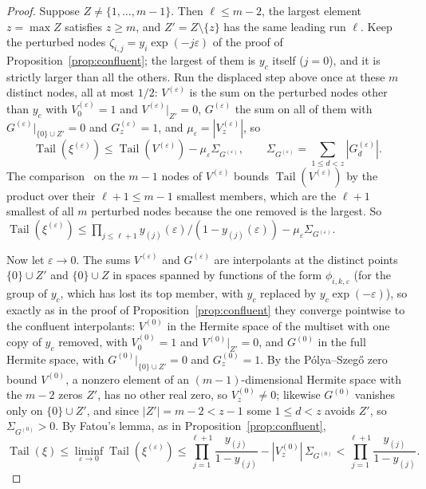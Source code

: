 \documentclass[11pt]{article}
\theoremstyle{definition}
\theoremstyle{plain}
\DeclareMathOperator{\Tail}{Tail}
\begin{document}
\begin{proof}
Suppose $Z\ne\{1,\ldots,m-1\}$.  Then $\ell\le m-2$, the largest element
$z=\max Z$ satisfies $z\ge m$, and $Z'=Z\setminus\{z\}$ has the same leading
run $\ell$.  Keep the perturbed nodes $\zeta_{i,j}=y_i\exp(-j\varepsilon)$ of the
proof of Proposition~\ref{prop:confluent}; the largest of them is
$y_c$ itself ($j=0$), and it is strictly larger than all the others.  Run the
displaced step above once at these $m$ distinct nodes, all at most $1/2$:
$V^{(\varepsilon)}$ is the sum on the perturbed nodes other than $y_c$ with
$V^{(\varepsilon)}_0=1$ and $V^{(\varepsilon)}|_{Z'}=0$, $G^{(\varepsilon)}$
the sum on all of them with $G^{(\varepsilon)}|_{\{0\}\cup Z'}=0$ and
$G^{(\varepsilon)}_z=1$, and $\mu_\varepsilon=|V^{(\varepsilon)}_z|$, so
\[
  \Tail(\xi^{(\varepsilon)})
  \le\Tail(V^{(\varepsilon)})-\mu_\varepsilon \Sigma_{G^{(\varepsilon)}},
  \qquad
  \Sigma_{G^{(\varepsilon)}}=\sum_{1\le d<z}|G^{(\varepsilon)}_d| .
\]
The comparison~\cite[Theorem~2.2]{coefficient-mass} on the $m-1$ nodes of $V^{(\varepsilon)}$ bounds
$\Tail(V^{(\varepsilon)})$ by the product over their $\ell+1\le m-1$ smallest
members, which are the $\ell+1$ smallest of all $m$ perturbed nodes because the
one removed is the largest.  So
$\Tail(\xi^{(\varepsilon)})\le\prod_{j\le \ell+1}y_{(j)}(\varepsilon)/(1-y_{(j)}(\varepsilon))
-\mu_\varepsilon \Sigma_{G^{(\varepsilon)}}$.

Now let $\varepsilon\to0$.  The sums $V^{(\varepsilon)}$ and
$G^{(\varepsilon)}$ are interpolants at the distinct points $\{0\}\cup Z'$
and $\{0\}\cup Z$ in spaces spanned by functions of the form
$\phi_{i,k,\varepsilon}$ (for the group of $y_c$, which has lost its top
member, with $y_c$ replaced by $y_c\exp(-\varepsilon)$), so exactly as in the
proof of Proposition~\ref{prop:confluent} they converge pointwise to the
confluent interpolants: $V^{(0)}$ in the Hermite space of the multiset with one
copy of $y_c$ removed, with $V^{(0)}_0=1$ and $V^{(0)}|_{Z'}=0$, and $G^{(0)}$
in the full Hermite space, with $G^{(0)}|_{\{0\}\cup Z'}=0$ and $G^{(0)}_z=1$.
By the P\'olya--Szeg\H o zero bound $V^{(0)}$, a nonzero element of an
$(m-1)$-dimensional Hermite space with the $m-2$ zeros $Z'$, has no other real
zero, so $V^{(0)}_z\ne0$; likewise $G^{(0)}$ vanishes only on
$\{0\}\cup Z'$, and since $|Z'|=m-2<z-1$ some $1\le d<z$ avoids $Z'$, so
$\Sigma_{G^{(0)}}>0$.  By Fatou's lemma, as in Proposition~\ref{prop:confluent},
\[
  \Tail(\xi)\le\liminf_{\varepsilon\to0}\Tail(\xi^{(\varepsilon)})
  \le\prod_{j=1}^{\ell+1}\frac{y_{(j)}}{1-y_{(j)}}-|V^{(0)}_z|\,\Sigma_{G^{(0)}}
  <\prod_{j=1}^{\ell+1}\frac{y_{(j)}}{1-y_{(j)}} .
\]
\end{proof}
\end{document}

